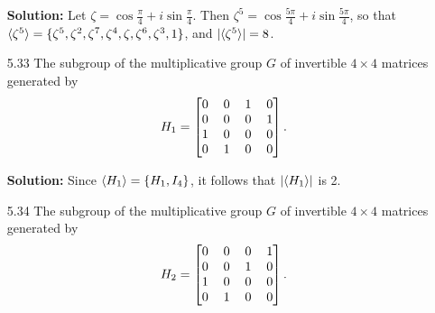 \begin{enumerate}
      \textbf{Solution:} Let $\zeta = \cos\frac{\pi}{4} + i\sin\frac{\pi}{4}$.
      Then $\zeta^{5} = \cos\frac{5\pi}{4} + i\sin\frac{5\pi}{4}$, so that
      $\langle \zeta^5 \rangle = \{\zeta^5, \zeta^2, \zeta^7, \zeta^4,
       \zeta, \zeta^6, \zeta^3, 1\}$, and $|\langle \zeta^5 \rangle| = 8$.
   \item[5.33] The subgroup of the multiplicative group $G$ of invertible
               $4 \times 4$ matrices generated by
               $$H_1 = \left[
                  \begin{tabular}{@{}c c c c@{}}
                     0 & 0 & 1 & 0 \\
                     0 & 0 & 0 & 1 \\
                     1 & 0 & 0 & 0 \\
                     0 & 1 & 0 & 0
                  \end{tabular}\right].$$

      \textbf{Solution:} Since $\langle H_1 \rangle = \{H_1, I_4\}$, it follows that
      $|\langle H_1 \rangle|$ is 2.
   \item[5.34] The subgroup of the multiplicative group $G$ of invertible
               $4 \times 4$ matrices generated by
               $$H_2 = \left[
                  \begin{tabular}{@{}c c c c@{}}
                     0 & 0 & 0 & 1 \\
                     0 & 0 & 1 & 0 \\
                     1 & 0 & 0 & 0 \\
                     0 & 1 & 0 & 0
                  \end{tabular}\right].$$


\end{enumerate}
